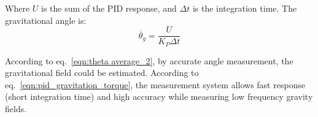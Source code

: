 \documentclass[\main/master.tex]{subfiles}
\begin{document}
Where $U$ is the sum of the PID response, and $\Delta t$ is the integration time. The gravitational angle is:
\begin{equation}
\overline{\theta}_g = \frac{U}{K_P\Delta t}      \label{eqn:pid_gravitation_torque}
\end{equation}
\par\noindent
According to eq.~\ref{eqn:theta average_2}, by accurate angle measurement, the gravitational field could be estimated. According to eq.~\ref{eqn:pid_gravitation_torque}, the measurement system allows fast response (short integration time) and high accuracy while measuring low frequency gravity fields. 

 
 
 
 
\end{document}
